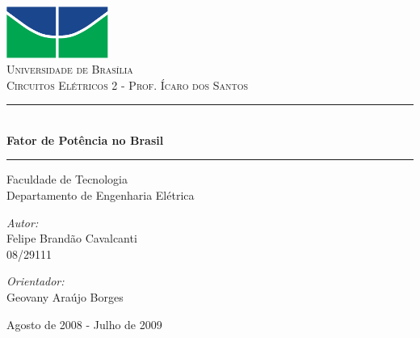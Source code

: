 \documentclass[a4paper,11pt]{article}
\newcommand{\HRule}{\rule{\linewidth}{0.5mm}}
\begin{document}
\begin{titlepage}
\begin{center}
 
\includegraphics[width=0.25\textwidth]{./unb.pdf}\\[1cm]
 
\textsc{\LARGE Universidade de Brasília}\\[1.5cm]
 
\textsc{\Large Circuitos Elétricos 2 - Prof. Ícaro dos Santos}\\[0.5cm]
 
\HRule \\[0.4cm]
{ \huge \bfseries Fator de Potência no Brasil}
\HRule
\vspace{0.75cm}
\large Faculdade de Tecnologia\\Departamento de Engenharia Elétrica \\
\vspace{0.8cm}
\begin{minipage}{0.4\textwidth}
\begin{flushleft} \large
\emph{Autor:}\\
Felipe Brandão Cavalcanti\\
08/29111
\end{flushleft}
\end{minipage}
\begin{minipage}{0.4\textwidth}
\begin{flushright} \large
\emph{Orientador:} \\
Geovany Araújo Borges
\end{flushright}
\end{minipage}
 
\vfill
 
{\large Agosto de 2008 - Julho de 2009}
\end{center}
\end{titlepage}

\pagestyle{plain}

\begin{abstract}
\( x^2 + y^2 = 1 \) This document focuses on the set-up and basic use of the circuit\_macros package by J. D. Aplevich, enabling the users to embed high-quality circuits into their \LaTeX\ documents. More specifically, this note focuses in the setup in the Mac OS X system, which has became very popular among engineering students in the last few years.
\end{abstract}
\end{document}
